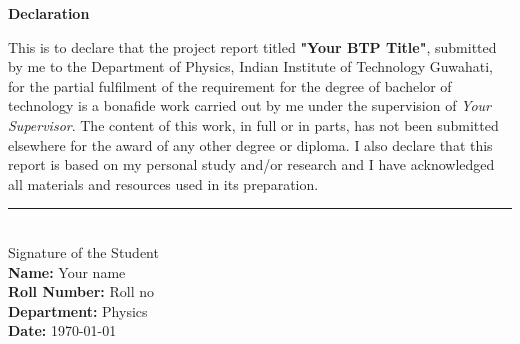 \begin{center}
    \fontsize{20pt}{25pt}\selectfont
    \textbf{Declaration}
\end{center}

\vspace{1.5cm}

This is to declare that the project report titled \textbf{"Your BTP Title"}, submitted by me to the Department of Physics, Indian Institute of Technology Guwahati, for the partial fulfilment of the requirement for the degree of bachelor of technology is a bonafide work carried out by me under the supervision of \textit{Your Supervisor}. The
content of this work, in full or in parts, has not been submitted elsewhere for the award of any other degree or diploma. I also declare that this report is based on my personal study and/or research and I have acknowledged all materials and resources used in its preparation. 

\vspace{2cm}

\parbox[t]{\textwidth}{
    \rule{0.4\linewidth}{0.5pt} \hfill \\[4pt]%
	Signature of the Student \\[6pt]
	\textbf{Name:} Your name \\
	\textbf{Roll Number:} Roll no \\
	\textbf{Department:} Physics \\
	\textbf{Date:} \today%
}